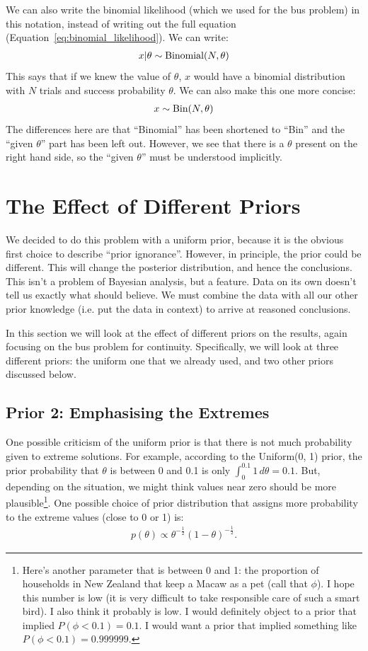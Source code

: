 We can also write the binomial likelihood (which we used for the bus problem)
in this notation, instead of writing out
the full equation (Equation~\ref{eq:binomial_likelihood}). We can write:
\begin{eqnarray}
x | \theta \sim \textnormal{Binomial}(N, \theta)
\end{eqnarray}
This says that if we knew the value of $\theta$, $x$ would have a binomial
distribution with $N$ trials and success probability $\theta$. We can also
make this one more concise:
\begin{eqnarray}
x \sim \textnormal{Bin}(N, \theta)
\end{eqnarray}
The differences here are that ``Binomial'' has been shortened to ``Bin'' and
the ``given $\theta$'' part has been left out. However, we see that there is
a $\theta$ present on the right hand side, so the ``given $\theta$'' must
be understood implicitly.

\section{The Effect of Different Priors}
We decided to do this problem with a uniform prior, because it is the obvious
first choice to describe ``prior ignorance''. However, in principle, the prior
could be different. This will change the posterior distribution, and hence
the conclusions. This isn't a problem of Bayesian analysis, but a feature. Data
on its own doesn't tell us exactly what should believe. We must
combine the data with all our other prior knowledge (i.e. put the data in context)
to arrive at reasoned conclusions.

In this section we will look at the effect of different priors
on the results, again focusing on the bus problem for continuity.
Specifically, we will look at three different priors: the
uniform one that we already used, and two other priors discussed below.

\subsection{Prior 2: Emphasising the Extremes}
One possible criticism of the uniform prior is that there is not much probability
given to extreme solutions. For example, according to the Uniform(0, 1) prior,
the prior probability that $\theta$ is
between 0 and 0.1 is only $\int_0^{0.1} 1 \, d\theta = 0.1$. But, depending on the situation, we might think
values near zero should be more plausible\footnote{Here's another parameter that is between 0 and 1: the proportion of
households in New Zealand that keep a Macaw as a pet (call that $\phi$).
I hope this number is low
(it is very difficult to take responsible care of such a smart bird). I also
think it probably is low. I would definitely object to a prior that implied
$P(\phi < 0.1) = 0.1$. I would want a prior that implied something like
$P(\phi < 0.1) = 0.999999$.}.
One
possible choice of prior distribution
that assigns more probability to the extreme values (close to 0 or 1) is:
\begin{eqnarray}
p(\theta) \propto \theta^{-\frac{1}{2}}(1 - \theta)^{-\frac{1}{2}}.\label{eq:prior2}
\end{eqnarray}

